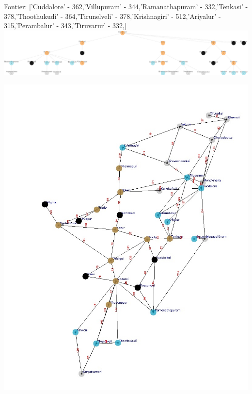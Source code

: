 \documentclass[xcolor=table]{beamer}
\begin{document}
\begin{frame}
  { \tiny Fontier: ['Cuddalore' - 362,'Villupuram' - 344,'Ramanathapuram' - 332,'Tenkasi' - 378,'Thoothukudi' - 364,'Tirunelveli' - 378,'Krishnagiri' - 512,'Ariyalur' - 315,'Perambalur' - 343,'Tiruvarur' - 332,]}
  \includegraphics[width=1\textwidth]{../UCSNodes/24-1.png}
  \begin{center}
    \includegraphics[height=0.6\textheight]{../UCSoutput/tamilUCS22.jpg}
  \end{center}
\end{frame}
\end{document}
